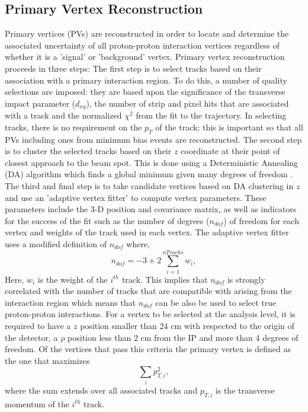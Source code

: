 \subsection{Primary Vertex Reconstruction}
Primary vertices (PVs) are reconstructed in order to locate and determine the associated uncertainty of all
proton-proton interaction vertices regardless of whether it is a 'signal' or 'background' vertex.
Primary vertex reconstruction proceeds in three steps:
The first step is to select tracks based on their association with a primary interaction region.
To do this, a number of quality selections are imposed: they are based upon the significance of the
transverse impact parameter ($d_{xy}$), the number of strip and pixel hits that are 
associated with a track and the normalized $\chi^{2}$ from the fit to the
trajectory. In selecting tracks, there is no requirement on the $p_{T}$ of the track; 
this is important so that all PVs including ones from minimum bias events are reconstructed.
The second step is to cluster the selected tracks based on their $z$ coordinate at their
point of closest approach to the beam spot. This is done using a Deterministic Annealing (DA)
algorithm which finds a global minimum given many degrees of freedom \cite{DAAnnealing}.
The third and final step is to take candidate vertices based on DA clustering in $z$ and use
an 'adaptive vertex fitter' \cite{KalmanFilter} 
to compute vertex parameters. These parameters include the 3-D position and covariance matrix,
as well as indicators for the success of the fit such as the number of degrees ($n_{dof}$) of freedom for
each vertex and weights of the track used in each vertex. The adaptive vertex fitter
uses a modified definition of $n_{dof}$ where,
\begin{equation}
n_{dof} = -3+2\sum^{nTracks}_{i=1} w_{i},
\end{equation}
Here, $w_{i}$ is the weight of the $i^{th}$ track. This implies that $n_{dof}$ is strongly
correlated with the number of tracks that are compatible with arising from the interaction
region which means that $n_{dof}$ can be also be used to select true proton-proton interactions.
For a vertex to be selected at the analysis level, it is required to have a $z$ position
smaller than 24 cm with respected to the origin of the detector, a $\rho$ position
less than 2 cm from the IP and more than 4 degrees of freedom. Of the vertices
that pass this criteria the primary vertex is defined as the one that maximizes
\begin{equation}
\sum_{i} p_{T,i}^{2},
\end{equation}
where the sum extends over all associated tracks and $p_{T,i}$ is the transverse momentum
of the $i^{th}$ track.
